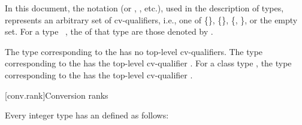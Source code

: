 \pnum
In this document, the notation \cv{} (or
, , etc.), used in the description of types,
represents an arbitrary set of cv-qualifiers, i.e., one of
\{\}, \{\}, \{,
\}, or the empty set.
For a type \cv{}~, the 
of that type are those denoted by \cv.
\begin{example}
The type corresponding to the 
has no top-level cv-qualifiers.
The type corresponding to the 
has the top-level cv-qualifier .
For a class type ,
the type corresponding to the 
has the top-level cv-qualifier .
\end{example}

[conv.rank]{Conversion ranks}%

\pnum
Every integer type has an  defined as follows:

